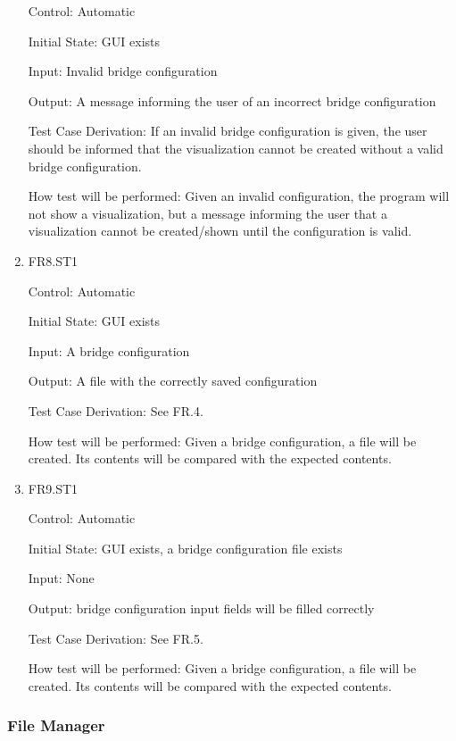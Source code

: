 \documentclass[12pt, titlepage]{article}
\begin{document}
\begin{enumerate}
  Control: Automatic
  
  Initial State: GUI exists
  
  Input: Invalid bridge configuration
  
  Output: A message informing the user of an incorrect bridge configuration
  
  Test Case Derivation: If an invalid bridge configuration is given, the user should be informed
  that the visualization cannot be created without a valid bridge configuration.
  
  How test will be performed: Given an invalid configuration, the program will not show
  a visualization, but a message informing the user that a visualization cannot be created/shown
  until the configuration is valid.
  
  \item{FR8.ST1\\}
  
  Control: Automatic
  
  Initial State: GUI exists
  
  Input: A bridge configuration
  
  Output: A file with the correctly saved configuration
  
  Test Case Derivation: See FR.4.
  
  How test will be performed: Given a bridge configuration, a file will be created. Its contents
  will be compared with the expected contents.
  
  
  \item{FR9.ST1\\}
  
  Control: Automatic
  
  Initial State: GUI exists, a bridge configuration file exists
  
  Input: None
  
  Output: bridge configuration input fields will be filled correctly
  
  Test Case Derivation: See FR.5.
  
  How test will be performed: Given a bridge configuration, a file will be created. Its contents
  will be compared with the expected contents.

\end{enumerate}

\subsubsection{File Manager}
\end{document}
